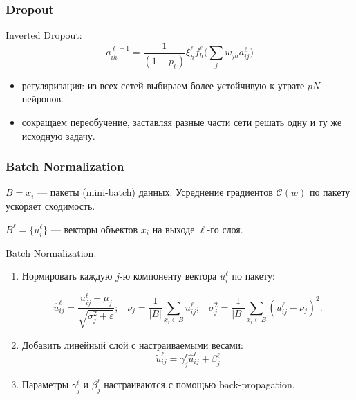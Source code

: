 \documentclass[11pt]{beamer}
\begin{document}
	\begin{frame}
		\frametitle{Dropout}
		
		{\color{blue} Inverted Dropout:} $$a^{\ell+1}_{ih} = \dfrac{1}{(1 - p_{\ell})} \xi^{\ell}_h f_h^{\ell}\big( \sum\limits_{j} w_{jh}a_{ij}^{\ell} \big)$$
		
		\begin{itemize}
			\item регуляризация: из всех сетей выбираем  более устойчивую к утрате $pN$ нейронов.
			\item сокращаем переобучение, заставляя разные части сети решать одну и ту же исходную задачу. 
		\end{itemize}
		
	\end{frame}

	\begin{frame}
		\frametitle{Batch Normalization}
		
		$B = {x_i}$ --- пакеты (mini-batch) данных.
		Усреднение градиентов $\mathcal{C}(w)$ по пакету ускоряет сходимость.
		
		$B^{\ell} = \{u_i^{\ell}\}$ --- векторы объектов $x_i$ на выходе $\ell$-го слоя.
		
		{\color{blue} Batch Normalization:}
		
		\begin{enumerate}
			\item Нормировать каждую $j$-ю компоненту вектора $u_i^{\ell}$ по пакету:
			
			$$ \hat{u}_{ij}^{\ell} = \dfrac{u_{ij}^{\ell} - \mu_j}{\sqrt{\sigma^2_j + \varepsilon}}; \; \; \;
			 	\nu_j = \dfrac{1}{|B|} \sum\limits_{x_i \in B} u_{ij}^{\ell}; \; \; \;
			 	\sigma^2_j = \dfrac{1}{|B|} \sum\limits_{x_i \in B} (u_{ij}^{\ell} - \nu_j)^2. $$
			\item Добавить линейный слой с настраиваемыми весами:
				$$ \tilde{u}_{ij}^{\ell} = \gamma_j^\ell \hat{u}_{ij}^{\ell} + \beta_j^\ell $$
			\item Параметры $\gamma_j^\ell$ и $\beta_j^\ell$ настраиваются с помощью back-propagation.
		\end{enumerate}
		
		
	\end{frame}
	
\end{document}
